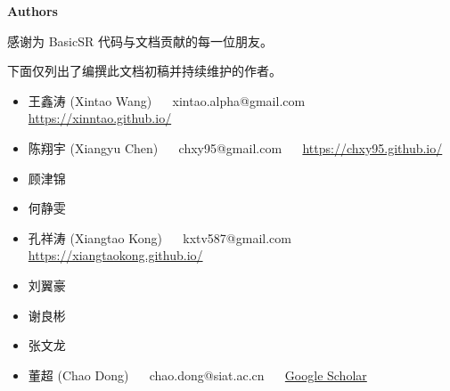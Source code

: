 \documentclass[../main.tex]{subfiles}
\begin{document}
\newpage

{\Large\textbf{Authors}}

感谢为 BasicSR 代码与文档贡献的每一位朋友。

下面仅列出了编撰此文档初稿并持续维护的作者。

\begin{itemize}
    \item 王鑫涛 (Xintao Wang) ~~ xintao.alpha@gmail.com ~~ \url{https://xinntao.github.io/}
    \item 陈翔宇 (Xiangyu Chen) ~~ chxy95@gmail.com ~~ \url{https://chxy95.github.io/}
    \item 顾津锦
    \item 何静雯
    \item 孔祥涛 (Xiangtao Kong) ~~ kxtv587@gmail.com ~~ \url{https://xiangtaokong.github.io/}
    \item 刘翼豪
    \item 谢良彬
    \item 张文龙
    \item 董超 (Chao Dong) ~~ chao.dong@siat.ac.cn ~~ \href{https://scholar.google.com.hk/citations?user=OSDCB0UAAAAJ}{Google Scholar}
\end{itemize}
\end{document}
